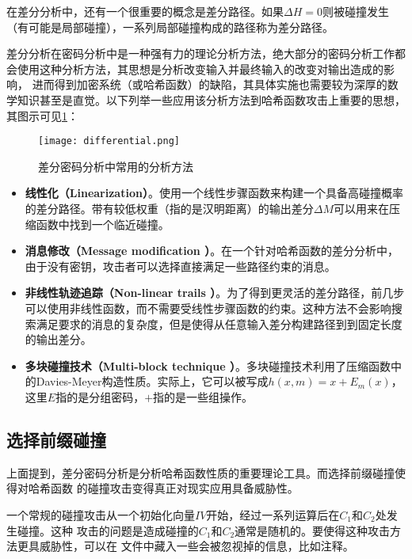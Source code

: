 在差分分析中，还有一个很重要的概念是差分路径。如果$\Delta H=0$则被碰撞发生（有可能是局部碰撞），一系列局部碰撞构成的路径称为差分路径\cite{wang2005finding}。

差分分析在密码分析中是一种强有力的理论分析方法，绝大部分的密码分析工作都会使用这种分析方法，其思想是分析改变输入并最终输入的改变对输出造成的影响，
进而得到加密系统（或哈希函数）的缺陷，其具体实施也需要较为深厚的数学知识甚至是直觉。以下列举一些应用该分析方法到哈希函数攻击上重要的思想，其图示可见\ref{fig:diff}：

\begin{figure}[h]
    \centering
    \texttt{[image: differential.png]}
    \caption{差分密码分析中常用的分析方法}
    \label{fig:diff}
\end{figure}

\begin{itemize}
    \item \textbf{线性化（Linearization\cite{chabaud1998differential}）}。使用一个线性步骤函数来构建一个具备高碰撞概率的差分路径。带有较低权重（指的是汉明距离）的输出差分$\Delta M$可以用来在压缩函数中找到一个临近碰撞。
    \item \textbf{消息修改（Message modification \cite{biham2004near}\cite{wang2005finding}）}。在一个针对哈希函数的差分分析中，由于没有密钥，攻击者可以选择直接满足一些路径约束的消息。
    \item \textbf{非线性轨迹追踪（Non-linear trails \cite{wang2005finding}）}。为了得到更灵活的差分路径，前几步可以使用非线性函数，而不需要受线性步骤函数的约束。这种方法不会影响搜索满足要求的消息的复杂度，但是使得从任意输入差分构建路径到到固定长度的输出差分。
    \item \textbf{多块碰撞技术（Multi-block technique \cite{chabaud1998differential}\cite{wang2005finding}）}。多块碰撞技术利用了压缩函数中的Davies-Meyer构造性质。实际上，它可以被写成$h(x, m)=x + E_m(x)$，这里$E$指的是分组密码，$+$指的是一些组操作。
\end{itemize}

\subsection{选择前缀碰撞}

上面提到，差分密码分析是分析哈希函数性质的重要理论工具。而选择前缀碰撞\cite{stevens2007chosen}使得对哈希函数
的碰撞攻击变得真正对现实应用具备威胁性。

一个常规的碰撞攻击从一个初始化向量$IV$开始，经过一系列运算后在$C_1$和$C_2$处发生碰撞。这种
攻击的问题是造成碰撞的$C_1$和$C_2$通常是随机的。要使得这种攻击方法更具威胁性，可以在
文件中藏入一些会被忽视掉的信息，比如注释。

